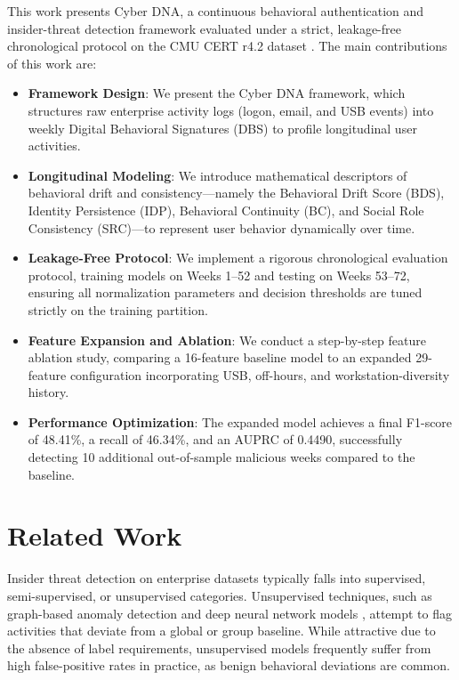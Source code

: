 \documentclass[pdflatex,sn-mathphys-num]{sn-jnl}
\theoremstyle{thmstyleone}
\theoremstyle{thmstyletwo}
\theoremstyle{thmstylethree}
\begin{document}
This work presents Cyber DNA, a continuous behavioral authentication and insider-threat detection framework evaluated under a strict, leakage-free chronological protocol on the CMU CERT r4.2 dataset \cite{cert2020dataset}. The main contributions of this work are:
\begin{itemize}
    \item \textbf{Framework Design}: We present the Cyber DNA framework, which structures raw enterprise activity logs (logon, email, and USB events) into weekly Digital Behavioral Signatures (DBS) to profile longitudinal user activities.
    \item \textbf{Longitudinal Modeling}: We introduce mathematical descriptors of behavioral drift and consistency---namely the Behavioral Drift Score (BDS), Identity Persistence (IDP), Behavioral Continuity (BC), and Social Role Consistency (SRC)---to represent user behavior dynamically over time.
    \item \textbf{Leakage-Free Protocol}: We implement a rigorous chronological evaluation protocol, training models on Weeks 1--52 and testing on Weeks 53--72, ensuring all normalization parameters and decision thresholds are tuned strictly on the training partition.
    \item \textbf{Feature Expansion and Ablation}: We conduct a step-by-step feature ablation study, comparing a 16-feature baseline model to an expanded 29-feature configuration incorporating USB, off-hours, and workstation-diversity history.
    \item \textbf{Performance Optimization}: The expanded model achieves a final F1-score of 48.41\%, a recall of 46.34\%, and an AUPRC of 0.4490, successfully detecting 10 additional out-of-sample malicious weeks compared to the baseline.
\end{itemize}

\section{Related Work}\label{sec2}
Insider threat detection on enterprise datasets typically falls into supervised, semi-supervised, or unsupervised categories. Unsupervised techniques, such as graph-based anomaly detection \cite{eberle2009anomaly} and deep neural network models \cite{tuor2017deep}, attempt to flag activities that deviate from a global or group baseline. While attractive due to the absence of label requirements, unsupervised models frequently suffer from high false-positive rates in practice, as benign behavioral deviations are common.
\end{document}

